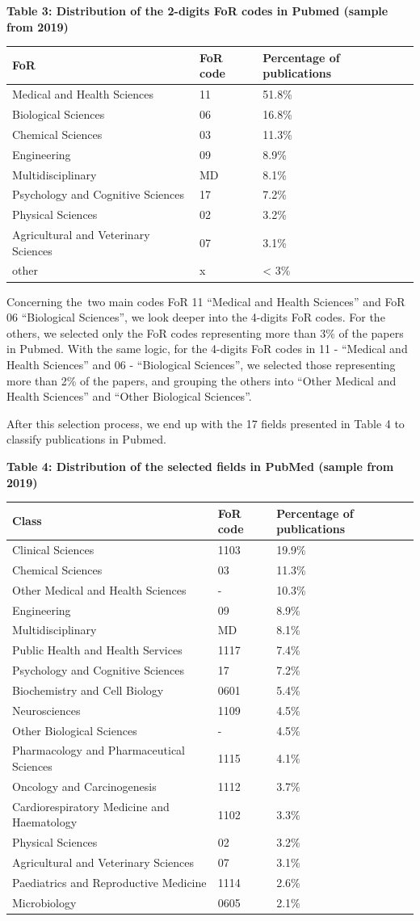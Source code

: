 \documentclass[
]{article}
\begin{document}
\textbf{Table 3: Distribution of the 2-digits FoR codes in Pubmed
(sample from 2019)}

\begin{longtable}[]{@{}lll@{}}
\toprule
FoR & FoR code & Percentage of publications\tabularnewline
\midrule
\endhead
Medical and Health Sciences & 11 & 51.8\%\tabularnewline
Biological Sciences & 06 & 16.8\%\tabularnewline
Chemical Sciences & 03 & 11.3\%\tabularnewline
Engineering & 09 & 8.9\%\tabularnewline
Multidisciplinary & MD & 8.1\%\tabularnewline
Psychology and Cognitive Sciences & 17 & 7.2\%\tabularnewline
Physical Sciences & 02 & 3.2\%\tabularnewline
Agricultural and Veterinary Sciences & 07 & 3.1\%\tabularnewline
other & x & \textless{} 3\%\tabularnewline
\bottomrule
\end{longtable}

Concerning the~two main codes FoR 11 ``Medical and Health Sciences'' and
FoR 06 ``Biological Sciences'', we look deeper into the 4-digits FoR
codes. For the others, we selected only the FoR codes representing more
than 3\% of the papers in Pubmed. With the same logic, for the 4-digits
FoR codes in 11 - ``Medical and Health Sciences'' and 06 - ``Biological
Sciences'', we selected those representing more than 2\% of the papers,
and grouping the others into ``Other Medical and Health Sciences'' and
``Other Biological Sciences''.

After this selection process, we end up with the 17 fields presented in
Table 4 to classify publications in Pubmed.

\textbf{Table 4: Distribution of the selected fields in PubMed (sample
from 2019)}

\begin{longtable}[]{@{}lll@{}}
\toprule
Class & FoR code & Percentage of publications\tabularnewline
\midrule
\endhead
Clinical Sciences & 1103 & 19.9\%\tabularnewline
Chemical Sciences & 03 & 11.3\%\tabularnewline
Other Medical and Health Sciences & - & 10.3\%\tabularnewline
Engineering & 09 & 8.9\%\tabularnewline
Multidisciplinary & MD & 8.1\%\tabularnewline
Public Health and Health Services & 1117 & 7.4\%\tabularnewline
Psychology and Cognitive Sciences & 17 & 7.2\%\tabularnewline
Biochemistry and Cell Biology & 0601 & 5.4\%\tabularnewline
Neurosciences & 1109 & 4.5\%\tabularnewline
Other Biological Sciences & - & 4.5\%\tabularnewline
Pharmacology and Pharmaceutical Sciences & 1115 & 4.1\%\tabularnewline
Oncology and Carcinogenesis & 1112 & 3.7\%\tabularnewline
Cardiorespiratory Medicine and Haematology & 1102 & 3.3\%\tabularnewline
Physical Sciences & 02 & 3.2\%\tabularnewline
Agricultural and Veterinary Sciences & 07 & 3.1\%\tabularnewline
Paediatrics and Reproductive Medicine & 1114 & 2.6\%\tabularnewline
Microbiology & 0605 & 2.1\%\tabularnewline
\bottomrule
\end{longtable}
\end{document}
